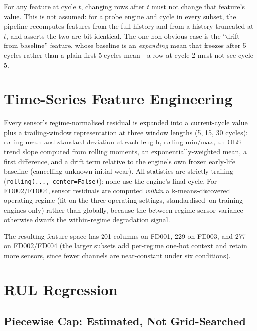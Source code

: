 \documentclass[9pt,a4paper,twocolumn,twoside]{rho-class/rho}
\begin{document}
    \begin{rhoenv}[frametitle=Causality test]
        For any feature at cycle $t$, changing rows after $t$ must not change that feature's value. This is not assumed: for a probe engine and cycle in every subset, the pipeline recomputes features from the full history and from a history truncated at $t$, and asserts the two are bit-identical. The one non-obvious case is the ``drift from baseline'' feature, whose baseline is an \emph{expanding} mean that freezes after 5 cycles rather than a plain first-5-cycles mean - a row at cycle 2 must not see cycle 5.
    \end{rhoenv}

\section{Time-Series Feature Engineering}

    Every sensor's regime-normalised residual is expanded into a current-cycle value plus a trailing-window representation at three window lengths (5, 15, 30 cycles): rolling mean and standard deviation at each length, rolling min/max, an OLS trend slope computed from rolling moments, an exponentially-weighted mean, a first difference, and a drift term relative to the engine's own frozen early-life baseline (cancelling unknown initial wear). All statistics are strictly trailing (\texttt{rolling(..., center=False)}); none use the engine's final cycle. For FD002/FD004, sensor residuals are computed \emph{within} a k-means-discovered operating regime (fit on the three operating settings, standardised, on training engines only) rather than globally, because the between-regime sensor variance otherwise dwarfs the within-regime degradation signal.

    The resulting feature space has 201 columns on FD001, 229 on FD003, and 277 on FD002/FD004 (the larger subsets add per-regime one-hot context and retain more sensors, since fewer channels are near-constant under six conditions).

\section{RUL Regression}
\label{sec:rul}

    \subsection{Piecewise Cap: Estimated, Not Grid-Searched}
\end{document}
